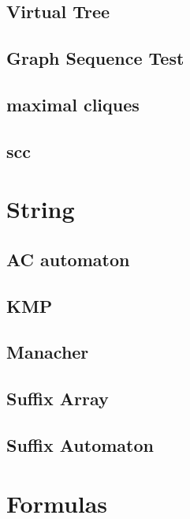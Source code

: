 \subsection{Virtual Tree}

\subsection{Graph Sequence Test}

\subsection{maximal cliques}

\subsection{scc}



\section{String}
\subsection{AC automaton}

\subsection{KMP}

\subsection{Manacher}

\subsection{Suffix Array}

\subsection{Suffix Automaton}


\section{Formulas}


